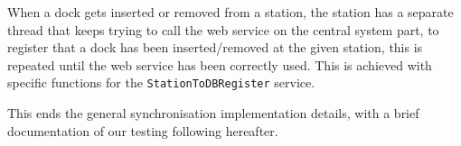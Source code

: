 \begin{description}[style=nextline]
	\item[Dock insertion/removal]
	When a dock gets inserted or removed from a station, the station has a separate thread that keeps trying to call the web service on the central system part, to register that a dock has been inserted/removed at the given station, this is repeated until the web service has been correctly used.
	This is achieved with specific functions for the \texttt{StationToDBRegister} service.
	
\end{description}

This ends the general synchronisation implementation details, with a brief documentation of our testing following hereafter.
